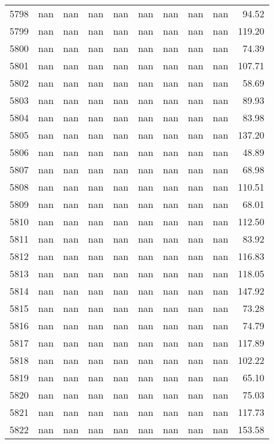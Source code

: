 \begin{tabular}{lrrrrrrrrr}
5798 & nan & nan & nan & nan & nan & nan & nan & nan & 94.52 \\
5799 & nan & nan & nan & nan & nan & nan & nan & nan & 119.20 \\
5800 & nan & nan & nan & nan & nan & nan & nan & nan & 74.39 \\
5801 & nan & nan & nan & nan & nan & nan & nan & nan & 107.71 \\
5802 & nan & nan & nan & nan & nan & nan & nan & nan & 58.69 \\
5803 & nan & nan & nan & nan & nan & nan & nan & nan & 89.93 \\
5804 & nan & nan & nan & nan & nan & nan & nan & nan & 83.98 \\
5805 & nan & nan & nan & nan & nan & nan & nan & nan & 137.20 \\
5806 & nan & nan & nan & nan & nan & nan & nan & nan & 48.89 \\
5807 & nan & nan & nan & nan & nan & nan & nan & nan & 68.98 \\
5808 & nan & nan & nan & nan & nan & nan & nan & nan & 110.51 \\
5809 & nan & nan & nan & nan & nan & nan & nan & nan & 68.01 \\
5810 & nan & nan & nan & nan & nan & nan & nan & nan & 112.50 \\
5811 & nan & nan & nan & nan & nan & nan & nan & nan & 83.92 \\
5812 & nan & nan & nan & nan & nan & nan & nan & nan & 116.83 \\
5813 & nan & nan & nan & nan & nan & nan & nan & nan & 118.05 \\
5814 & nan & nan & nan & nan & nan & nan & nan & nan & 147.92 \\
5815 & nan & nan & nan & nan & nan & nan & nan & nan & 73.28 \\
5816 & nan & nan & nan & nan & nan & nan & nan & nan & 74.79 \\
5817 & nan & nan & nan & nan & nan & nan & nan & nan & 117.89 \\
5818 & nan & nan & nan & nan & nan & nan & nan & nan & 102.22 \\
5819 & nan & nan & nan & nan & nan & nan & nan & nan & 65.10 \\
5820 & nan & nan & nan & nan & nan & nan & nan & nan & 75.03 \\
5821 & nan & nan & nan & nan & nan & nan & nan & nan & 117.73 \\
5822 & nan & nan & nan & nan & nan & nan & nan & nan & 153.58 \\

\end{tabular}
